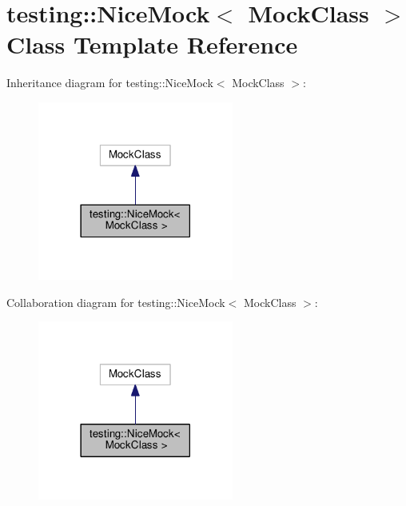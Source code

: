 \hypertarget{classtesting_1_1NiceMock}{}\section{testing\+:\+:Nice\+Mock$<$ Mock\+Class $>$ Class Template Reference}
\label{classtesting_1_1NiceMock}


Inheritance diagram for testing\+:\+:Nice\+Mock$<$ Mock\+Class $>$\+:\nopagebreak
\begin{figure}[H]
\begin{center}
\leavevmode
\includegraphics[width=182pt]{classtesting_1_1NiceMock__inherit__graph}
\end{center}
\end{figure}


Collaboration diagram for testing\+:\+:Nice\+Mock$<$ Mock\+Class $>$\+:\nopagebreak
\begin{figure}[H]
\begin{center}
\leavevmode
\includegraphics[width=182pt]{classtesting_1_1NiceMock__coll__graph}
\end{center}
\end{figure}

